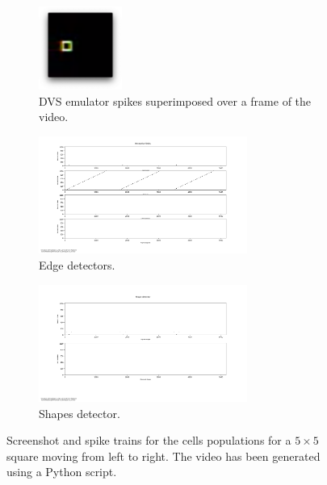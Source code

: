 \begin{figure}[ht]
\centering

\begin{subfigure}{\textwidth}
\centering
\includegraphics[width=0.3\textwidth]{images/appendix_evaluation/square_lr_spikes.png}
\caption{DVS emulator spikes superimposed over a frame of the video.}
\label{fig:square_lr_spikes}
\end{subfigure}

\begin{subfigure}{\textwidth}
\centering
\includegraphics[width=0.75\textwidth]{images/appendix_evaluation/square_lr_receptive_fields.png} 
\caption{Edge detectors.}
\label{fig:square_lr_receptive_fields}
\end{subfigure}

\begin{subfigure}{\textwidth}
\centering
\includegraphics[width=0.75\textwidth]{images/appendix_evaluation/square_lr_shape.png}
\caption{Shapes detector.}
\label{fig:square_lr_shape}
\end{subfigure}

\caption[$5\times 5$ Square Moving Left to Right]{Screenshot and spike trains for the cells populations for a $5\times 5$ square moving from left to right. The video has been generated using a Python script.}
\label{fig:square_lr_ev}
\end{figure}



